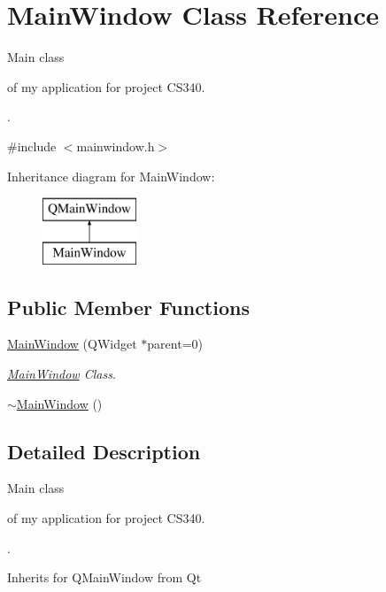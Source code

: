 \hypertarget{class_main_window}{\section{Main\-Window Class Reference}
\label{class_main_window}
}


Main class \begin{DoxyVerb}   of my application for project CS340.\end{DoxyVerb}
.  




{\ttfamily \#include $<$mainwindow.\-h$>$}

Inheritance diagram for Main\-Window\-:\begin{figure}[H]
\begin{center}
\leavevmode
\includegraphics[height=2.000000cm]{class_main_window}
\end{center}
\end{figure}
\subsection*{Public Member Functions}
\begin{DoxyCompactItemize}
\item 
\hyperlink{class_main_window_a8b244be8b7b7db1b08de2a2acb9409db}{Main\-Window} (Q\-Widget $\ast$parent=0)
\begin{DoxyCompactList}\small\item\em \hyperlink{class_main_window}{Main\-Window} Class. \end{DoxyCompactList}\item 
\hyperlink{class_main_window_ae98d00a93bc118200eeef9f9bba1dba7}{$\sim$\-Main\-Window} ()
\end{DoxyCompactItemize}


\subsection{Detailed Description}
Main class \begin{DoxyVerb}   of my application for project CS340.\end{DoxyVerb}
. 

Inherits for Q\-Main\-Window from Qt 

